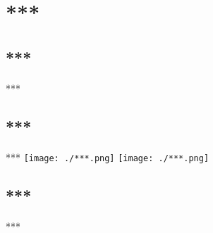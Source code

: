 \documentclass{ctexart}
\begin{document}
\section{***}
\subsection{***}
\paragraph{}***
\subsection{***}
\paragraph{}***
\texttt{[image: ./***.png]}
\texttt{[image: ./***.png]}
\clearpage
\subsection{***}
\paragraph{}***
\end{document}
